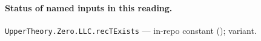 

\paragraph{Status of named inputs in this reading.}
\noindent\nolinkurl{UpperTheory.Zero.LLC.recTExists} --- in-repo constant (); variant.\par

